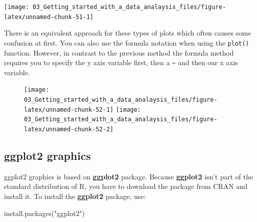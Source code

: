 \documentclass[
]{book}
\newenvironment{Shaded}{\begin{snugshade}}{\end{snugshade}}
\newcommand{\AttributeTok}[1]{\textcolor[rgb]{0.77,0.63,0.00}{#1}}
\newcommand{\DecValTok}[1]{\textcolor[rgb]{0.00,0.00,0.81}{#1}}
\newcommand{\FloatTok}[1]{\textcolor[rgb]{0.00,0.00,0.81}{#1}}
\newcommand{\FunctionTok}[1]{\textcolor[rgb]{0.00,0.00,0.00}{#1}}
\newcommand{\NormalTok}[1]{#1}
\newcommand{\SpecialCharTok}[1]{\textcolor[rgb]{0.00,0.00,0.00}{#1}}
\newcommand{\StringTok}[1]{\textcolor[rgb]{0.31,0.60,0.02}{#1}}
\begin{document}
\begin{center}\texttt{[image: 03\_Getting\_started\_with\_a\_data\_analaysis\_files/figure-latex/unnamed-chunk-51-1]} \end{center}

There is an equivalent approach for these types of plots which often causes some confusion at first. You can also use the formula notation when using the \texttt{plot()} function. However, in contrast to the previous method the formula method requires you to specify the y axis variable first, then a \texttt{\textasciitilde{}} and then our x axis variable.

\begin{Shaded}
\end{Shaded}

\begin{figure}
\texttt{[image: 03\_Getting\_started\_with\_a\_data\_analaysis\_files/figure-latex/unnamed-chunk-52-1]} \texttt{[image: 03\_Getting\_started\_with\_a\_data\_analaysis\_files/figure-latex/unnamed-chunk-52-2]} \end{figure}

\hypertarget{ggplot2-graphics}{%
\subsection{ggplot2 graphics}\label{ggplot2-graphics}}

ggplot2 graphics is based on \textbf{ggplot2} package. Because \textbf{ggplot2} isn't part of the standard distribution of R, you have to download the package from CRAN and install it. To install the \textbf{ggplot2} package, use:

\begin{Shaded}
\begin{Highlighting}[]
\FunctionTok{install.packages}\NormalTok{(}\StringTok{"ggplot2"}\NormalTok{)}
\end{Highlighting}
\end{Shaded}
\end{document}
